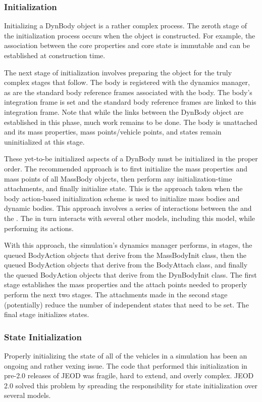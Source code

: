 \subsubsection{Initialization}\label{sec:key_initialization}
Initializing a DynBody object is a rather complex process. The zeroth stage
of the initialization process occurs when the object is constructed.
For example, the association between the core properties and core state is
immutable and can be established at construction time.

The next stage of initialization involves preparing the object for the truly
complex stages that follow. The body is registered with the dynamics manager,
as are the standard body reference frames associated with the body. The
body's integration frame is set and the standard body reference frames are
linked to this integration frame. Note that while the links between the
DynBody object are established in this phase, much work remains to be done.
The body is unattached and its mass properties, mass points/vehicle points, and
states remain uninitialized at this stage.

These yet-to-be initialized aspects of a DynBody must be initialized in the
proper order. The recommended approach is to first initialize the mass
properties and mass points of all MassBody objects, then perform any
initialization-time attachments, and finally initialize state. This is
the approach taken when the body action-based initialization scheme is used
to initialize mass bodies and dynamic bodies.
This approach involves a series of interactions
between the  and the .
The \BODYACTION in turn interacts with
several other models, including this model, while performing its actions.

With this approach, the simulation's dynamics manager performs, in stages,
the queued BodyAction objects that derive from the MassBodyInit class,
then the queued BodyAction objects that derive from the BodyAttach class,
and finally the queued BodyAction objects that derive from the DynBodyInit
class.
The first stage establishes the mass properties and the attach points needed to
properly perform the next two stages. The attachments made in the second stage
(potentially) reduce the number of independent states that need to be set.
The final stage initializes states.

\subsubsection{State Initialization}\label{sec:key_state_initialization}
Properly initializing the state of all of the vehicles in a simulation
has been an ongoing and rather vexing issue.
The code that performed this initialization in pre-2.0 releases of JEOD was
fragile, hard to extend, and overly complex. JEOD 2.0 solved this problem by
spreading the responsibility for state initialization over several models.

